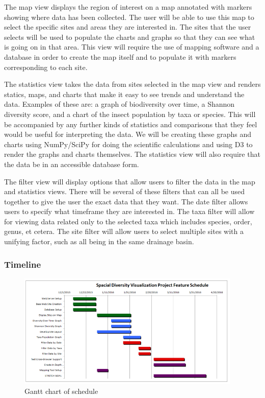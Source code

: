 The map view displays the region of interest on a map annotated with markers showing where data has been collected.
The user will be able to use this map to select the specific sites and areas they are interested in.
The sites that the user selects will be used to populate the charts and graphs so that they can see what is going on in that area.
This view will require the use of mapping software and a database in order to create the map itself and to populate it with markers corresponding to each site.

The statistics view takes the data from sites selected in the map view and renders statics, maps, and charts that make it easy to see trends and understand the data. Examples of these are: a graph of biodiversity over time, a Shannon diversity score, and a chart of the insect population by taxa or species.
This will be accompanied by any further kinds of statistics and comparisons that they feel would be useful for interpreting the data.
We will be creating these graphs and charts using NumPy/SciPy for doing the scientific calculations and using D3 to render the graphs and charts themselves.
The statistics view will also require that the data be in an accessible database form.

The filter view will display options that allow users to filter the data in the map and statistics views.
There will be several of these filters that can all be used together to give the user the exact data that they want.
The date filter allows users to specify what timeframe they are interested in.
The taxa filter will allow for viewing data related only to the selected taxa which includes species, order, genus, et cetera.
The site filter will allow users to select multiple sites with a unifying factor, such as all being in the same drainage basin.

\subsubsection{Timeline}

\begin{figure}[h]
	\centering
	\includegraphics[width=0.95\textwidth]{OriginalGantt.png}
	\captionsetup{justification=centering}
	\caption{
		Gantt chart of schedule
	}
	\label{fig:original_gantt}
\end{figure}

